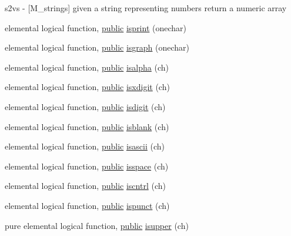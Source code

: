 \begin{DoxyCompactItemize}
\begin{DoxyCompactList}
s2vs -\/ \mbox{[}M\+\_\+strings\mbox{]} given a string representing numbers return a numeric array \end{DoxyCompactList}\item 
elemental logical function, \hyperlink{M__stopwatch_83_8txt_a2f74811300c361e53b430611a7d1769f}{public} \hyperlink{namespacem__strings_a267f2fde729a75496c82a64754a91e54}{isprint} (onechar)
\item 
elemental logical function, \hyperlink{M__stopwatch_83_8txt_a2f74811300c361e53b430611a7d1769f}{public} \hyperlink{namespacem__strings_a84c80fdeeba0679488ed8ad8d37e53c5}{isgraph} (onechar)
\item 
elemental logical function, \hyperlink{M__stopwatch_83_8txt_a2f74811300c361e53b430611a7d1769f}{public} \hyperlink{namespacem__strings_a5cf6d7fbd1b3ea17e37c6213c6ba0fdb}{isalpha} (ch)
\item 
elemental logical function, \hyperlink{M__stopwatch_83_8txt_a2f74811300c361e53b430611a7d1769f}{public} \hyperlink{namespacem__strings_a9953d1e400bedceab6a06910c6cdf208}{isxdigit} (ch)
\item 
elemental logical function, \hyperlink{M__stopwatch_83_8txt_a2f74811300c361e53b430611a7d1769f}{public} \hyperlink{namespacem__strings_a9f5f98a6c93e21618a16d98a5de2debc}{isdigit} (ch)
\item 
elemental logical function, \hyperlink{M__stopwatch_83_8txt_a2f74811300c361e53b430611a7d1769f}{public} \hyperlink{namespacem__strings_aebb074d3971c0b93e39d1cfaa45658d8}{isblank} (ch)
\item 
elemental logical function, \hyperlink{M__stopwatch_83_8txt_a2f74811300c361e53b430611a7d1769f}{public} \hyperlink{namespacem__strings_afb63e9fefbc04e4e9a2ec4df4334078c}{isascii} (ch)
\item 
elemental logical function, \hyperlink{M__stopwatch_83_8txt_a2f74811300c361e53b430611a7d1769f}{public} \hyperlink{namespacem__strings_ab32380c29451e56395153155c1632d74}{isspace} (ch)
\item 
elemental logical function, \hyperlink{M__stopwatch_83_8txt_a2f74811300c361e53b430611a7d1769f}{public} \hyperlink{namespacem__strings_a4821cb5a5c4024c9dc6dd159300034ca}{iscntrl} (ch)
\item 
elemental logical function, \hyperlink{M__stopwatch_83_8txt_a2f74811300c361e53b430611a7d1769f}{public} \hyperlink{namespacem__strings_a8712164e1f5fd717bdea854a3f067619}{ispunct} (ch)
\item 
pure elemental logical function, \hyperlink{M__stopwatch_83_8txt_a2f74811300c361e53b430611a7d1769f}{public} \hyperlink{namespacem__strings_ac98536a1b69026cd5373dfff489f7733}{isupper} (ch)

\end{DoxyCompactItemize}
